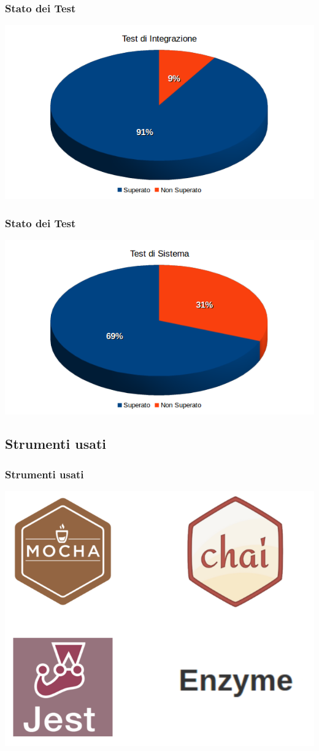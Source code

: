 \begin{frame}
	\frametitle{Stato dei Test}
	\begin{center}
	\includegraphics[scale=0.55]{img/TI.png}
    \end{center}
\end{frame}

\begin{frame}
	\frametitle{Stato dei Test}
	\begin{center}
	\includegraphics[scale=0.55]{img/TS.png}
    \end{center}
\end{frame}

\subsection{Strumenti usati}
\begin{frame}
	\frametitle{Strumenti usati}
	\begin{center}
	\includegraphics[scale=0.30]{img/strumenti.png}
	\end{center}
\end{frame}
